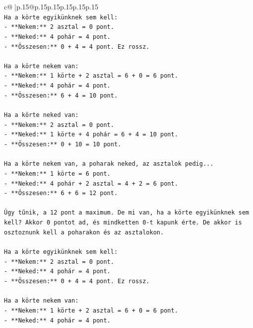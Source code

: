\documentclass{article}
\begin{document}
{\begin{supertabular}{c@{$\;$}|p{.15\linewidth}@{}p{.15\linewidth}p{.15\linewidth}p{.15\linewidth}p{.15\linewidth}p{.15\linewidth}}
{{{\\ 
\texttt{Ha a körte egyikünknek sem kell:} \\
\texttt{{-} **Nekem:** 2 asztal = 0 pont.} \\
\texttt{{-} **Neked:** 4 pohár = 4 pont.} \\
\texttt{{-} **Összesen:** 0 + 4 = 4 pont. Ez rossz.} \\
\\ 
\texttt{Ha a körte nekem van:} \\
\texttt{{-} **Nekem:** 1 körte + 2 asztal = 6 + 0 = 6 pont.} \\
\texttt{{-} **Neked:** 4 pohár = 4 pont.} \\
\texttt{{-} **Összesen:** 6 + 4 = 10 pont.} \\
\\ 
\texttt{Ha a körte neked van:} \\
\texttt{{-} **Nekem:** 2 asztal = 0 pont.} \\
\texttt{{-} **Neked:** 1 körte + 4 pohár = 6 + 4 = 10 pont.} \\
\texttt{{-} **Összesen:** 0 + 10 = 10 pont.} \\
\\ 
\texttt{Ha a körte nekem van, a poharak neked, az asztalok pedig...} \\
\texttt{{-} **Nekem:** 1 körte = 6 pont.} \\
\texttt{{-} **Neked:** 4 pohár + 2 asztal = 4 + 2 = 6 pont.} \\
\texttt{{-} **Összesen:** 6 + 6 = 12 pont.} \\
\\ 
\texttt{Úgy tűnik, a 12 pont a maximum. De mi van, ha a körte egyikünknek sem kell? Akkor 0 pontot ad, és mindketten 0{-}t kapunk érte. De akkor is osztoznunk kell a poharakon és az asztalokon.} \\
\\ 
\texttt{Ha a körte egyikünknek sem kell:} \\
\texttt{{-} **Nekem:** 2 asztal = 0 pont.} \\
\texttt{{-} **Neked:** 4 pohár = 4 pont.} \\
\texttt{{-} **Összesen:** 0 + 4 = 4 pont. Ez rossz.} \\
\\ 
\texttt{Ha a körte nekem van:} \\
\texttt{{-} **Nekem:** 1 körte + 2 asztal = 6 + 0 = 6 pont.} \\
\texttt{{-} **Neked:** 4 pohár = 4 pont.} \\
}}}
\end{supertabular}}
\end{document}
